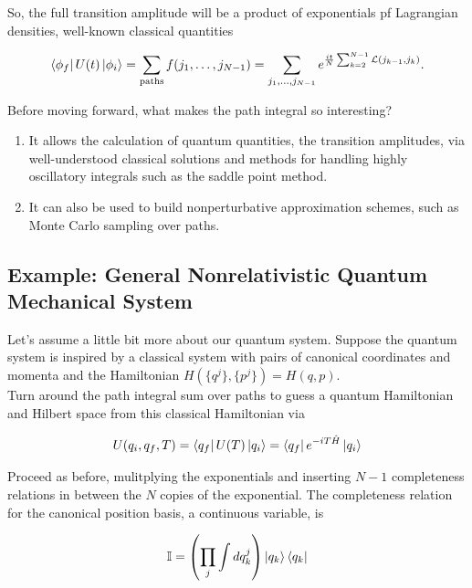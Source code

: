 \noindent So, the full transition amplitude will be a product of exponentials pf Lagrangian densities, well-known classical quantities

\begin{equation}
\bra{\phi_f} U(t) \ket{\phi_i} = \sum_{\text{paths}} f(j_1, \dots , j_{N-1}) = \sum_{j_1,\dots,j_{N-1}} e^{\frac{it}{N} \sum_{k=2}^{N-1} \mathcal{L} (j_{k-1}, j_k) } .
\end{equation}

\noindent Before moving forward, what makes the path integral so interesting?

\begin{enumerate}
\item It allows the calculation of quantum quantities, the transition amplitudes, via well-understood classical solutions and methods for handling highly oscillatory integrals such as the saddle point method.
\item It can also be used to build nonperturbative approximation schemes, such as Monte Carlo sampling over paths.
\end{enumerate}

\subsection*{Example: General Nonrelativistic Quantum Mechanical System}

\noindent Let's assume a little bit more about our quantum system. Suppose the quantum system is inspired by a classical system with pairs of canonical coordinates and momenta and the Hamiltonian $H(\{q^j\},\{p^j\}) = H(q,p)$. \\

\noindent Turn around the path integral sum over paths to guess a quantum Hamiltonian and Hilbert space from this classical Hamiltonian via

\begin{equation}
U(q_i, q_f, T) = \bra{q_f} U(T) \ket{q_i} = \bra{q_f} e^{-iT\hat{H}} \ket{q_i}
\end{equation}

\noindent Proceed as before, mulitplying the exponentials and inserting $N-1$ completeness relations in between the $N$ copies of the exponential. The completeness relation for the canonical position basis, a continuous variable, is

\begin{equation}
\mathbb{I} = \left( \prod_j \int dq_k^j \right) \ket{q_k} \bra{q_k}
\end{equation}

